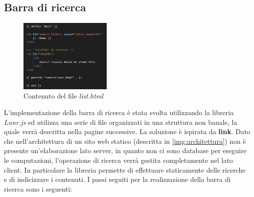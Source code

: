 \documentclass[target=bach,aauheader=]{thud}
\begin{document}
\subsection{Barra di ricerca}
\begin{figure}[b]
    \centering
    \includegraphics[width = 0.4\textwidth]{images/list-html.png}
    \caption{Contenuto del file \textit{list.html}}
    \label{img:list}
\end{figure}
L'implementazione della barra di ricerca è stata svolta utilizzando la libreria \textit{Lunr.js} ed utilizza una serie di file organizzati in una struttura non banale, la quale verrà descritta nella pagine successive.
La soluzione è ispirata da \textbf{link}.
\newline
Dato che nell'architettura di un sito web statico (descritta in \cref{img:architettura}) non è presente un'elaborazione lato server, in quanto non ci sono database per eseguire le computazioni, l'operazione di ricerca verrà gestita completamente nel lato client.
In particolare la libreria permette di effettuare staticamente delle ricerche e di indicizzare i contenuti. 
I passi seguiti per la realizzazione della barra di ricerca sono i seguenti:
\end{document}
